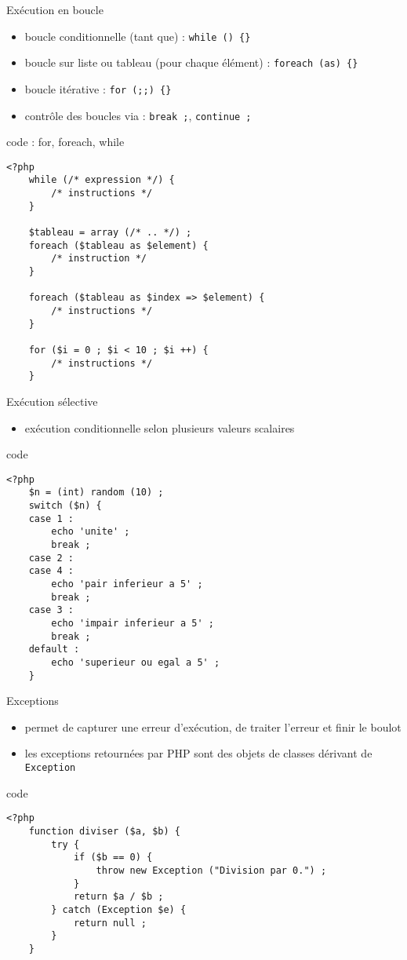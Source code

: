 \begin{frame}[containsverbatim]{Exécution en boucle} %
	\begin{itemize}
		\item boucle conditionnelle (tant que) : \texttt{while () \{\}}
		\item boucle sur liste ou tableau (pour chaque élément) : \texttt{foreach (as) \{\}}
		\item boucle itérative : \texttt{for (;;) \{\}}
		\item contrôle des boucles via : \lstinline!break ;!, \lstinline!continue ;!
	\end{itemize}
	\begin{block}{code : for, foreach, while}
		\begin{lstlisting}
<?php
	while (/* expression */) {
		/* instructions */
	}
	
	$tableau = array (/* .. */) ;
	foreach ($tableau as $element) {
		/* instruction */
	}
	
	foreach ($tableau as $index => $element) {
		/* instructions */
	}
	
	for ($i = 0 ; $i < 10 ; $i ++) {
		/* instructions */
	}
		\end{lstlisting}
	\end{block}
\end{frame}

\begin{frame}[containsverbatim]{Exécution sélective} %
	\begin{itemize}
		\item exécution conditionnelle selon plusieurs valeurs scalaires
	\end{itemize}
	\begin{block}{code}
		\begin{lstlisting}
<?php
	$n = (int) random (10) ;
	switch ($n) {
	case 1 :
		echo 'unite' ;
		break ;
	case 2 :
	case 4 :
		echo 'pair inferieur a 5' ;
		break ;
	case 3 :
		echo 'impair inferieur a 5' ;
		break ;
	default :
		echo 'superieur ou egal a 5' ;
	}
		\end{lstlisting}
	\end{block}
\end{frame}

\begin{frame}[containsverbatim]{Exceptions} %
	\begin{itemize}
		\item permet de capturer une erreur d'exécution, de traiter l'erreur et finir le boulot
		\item les exceptions retournées par PHP sont des objets de classes dérivant de \texttt{Exception}
	\end{itemize}
	\begin{block}{code}
		\begin{lstlisting}
<?php
	function diviser ($a, $b) {
		try {
			if ($b == 0) { 
				throw new Exception ("Division par 0.") ;
			}
			return $a / $b ;
		} catch (Exception $e) {
			return null ;
		}
	}
		\end{lstlisting}
	\end{block}
\end{frame}

